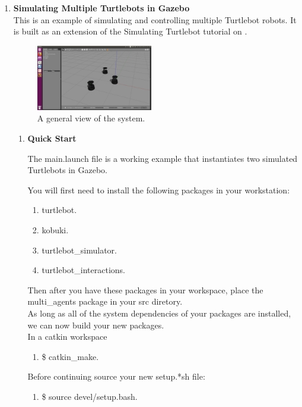 \documentclass[journal]{IEEEtran}
\begin{document}
\begin{enumerate}
\item \textbf {Simulating Multiple Turtlebots in Gazebo}\\
This is an example of simulating and controlling multiple Turtlebot robots. It is built as an extension of the Simulating Turtlebot tutorial on \cite{temp4}.

\begin{figure}[!h]
\begin{center}
\includegraphics[width=2in]{two.png}
\caption{A general view of the system.}
\end{center}
\label{fig:mypicture3}
\end{figure}

\begin{enumerate}
\item \textbf {Quick Start}

The main.launch file is a working example that instantiates two simulated Turtlebots in Gazebo. 

You will first need to install the following packages in your workstation:
\begin{enumerate}
\item {turtlebot}\cite{temp6}.
\item {kobuki}\cite{temp8}.
\item {turtlebot{\_}simulator}\cite{temp7}.
\item {turtlebot{\_}interactions}\cite{temp9}.
\end{enumerate}
Then after you have these packages in your workspace, place the multi{\_}agents\cite{temp5} package in your src diretory.\\
As long as all of the system dependencies of your packages are installed, we can now build your new packages.\\
In a catkin workspace

\begin{enumerate}
\item {{\$} catkin{\_}make}.
\end{enumerate}

Before continuing source your new setup.*sh file:
\begin{enumerate}
\item {{\$} source devel/setup.bash}.
\end{enumerate}


\end{enumerate}
\end{enumerate}
\end{document}
